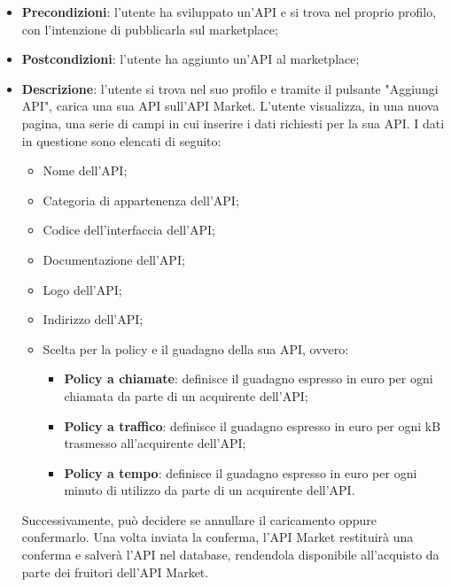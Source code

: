 \begin{itemize}
	\item \textbf{Precondizioni}: l'utente ha sviluppato un'API e si trova nel proprio profilo, con l'intenzione di pubblicarla sul marketplace;
	\item \textbf{Postcondizioni}: l'utente ha aggiunto un'API al marketplace;
	\item \textbf{Descrizione}: l'utente si trova nel suo profilo e tramite il pulsante "Aggiungi API", carica una sua API sull'API Market. L'utente visualizza, in una nuova pagina, una serie di campi in cui inserire i dati richiesti per la sua API. I dati in questione sono elencati di seguito:
	\begin{itemize}
		\item Nome dell'API;
		\item Categoria di appartenenza dell'API;
		\item Codice dell'interfaccia dell'API;
		\item Documentazione dell'API;
		\item Logo dell'API;
		\item Indirizzo dell'API;
		\item Scelta per la policy e il guadagno della sua API, ovvero:
		\begin{itemize}
			\item \textbf{Policy a chiamate}: definisce il guadagno espresso in euro per ogni chiamata da parte di un acquirente dell'API;
			\item \textbf{Policy a traffico}: definisce il guadagno espresso in euro per ogni kB trasmesso all'acquirente dell'API;
			\item \textbf{Policy a tempo}: definisce il guadagno espresso in euro per ogni minuto di utilizzo da parte di un acquirente dell'API.
		\end{itemize}		
	\end{itemize}
	Successivamente, può decidere se annullare il caricamento oppure confermarlo. Una volta inviata la conferma, l'API Market restituirà una conferma e salverà l'API nel database, rendendola disponibile all'acquisto da parte dei fruitori dell'API Market.
\end{itemize}
